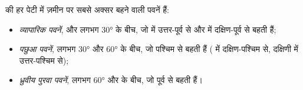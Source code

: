 \begin{definition}[वैश्विक पवनें]\label{def:g8:winds-global-circulation:global-winds}
 की हर पेटी में ज़मीन पर सबसे अक्सर बहने वाली पवनें हैं:
\begin{itemize}
  \item \emph{व्यापारिक पवनें},  और लगभग \ang{30}
        के बीच, जो  में उत्तर-पूर्व से और  में
        दक्षिण-पूर्व से बहती हैं;
  \item \emph{पछुआ पवनें}, लगभग \ang{30} और \ang{60} के बीच,
        जो पश्चिम से बहती हैं ( में दक्षिण-पश्चिम से, दक्षिणी में
        उत्तर-पश्चिम से);
  \item \emph{ध्रुवीय पुरवा पवनें}, लगभग \ang{60} और
         के बीच, जो पूर्व से बहती हैं।
\end{itemize}
\end{definition}

